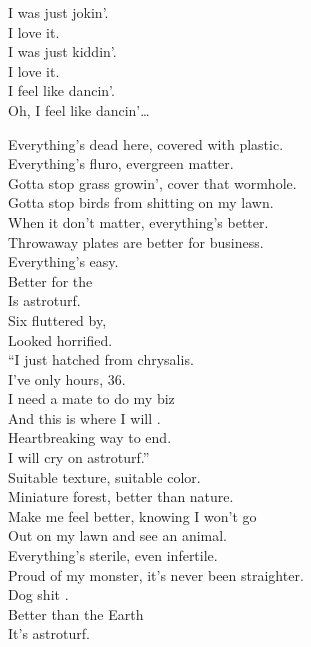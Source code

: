 I was just jokin'. \\
I love it. \\
I was just kiddin'. \\
I love it. \\

I feel like dancin'. \\
Oh, I feel like dancin'… \\





Everything's dead here, covered with plastic. \\
Everything's fluro, evergreen matter. \\
Gotta stop grass growin', cover that wormhole. \\
Gotta stop birds from shitting on my lawn. \\

When it don't matter, everything's better. \\
Throwaway plates are better for business. \\
Everything's easy. \\
Better for the  \\
Is astroturf. \\

Six  fluttered by, \\
Looked horrified. \\
``I just hatched from chrysalis. \\
I've only hours, 36. \\
I need a mate to do my biz \\
And this is where I will . \\
Heartbreaking way to end. \\
I will cry on astroturf.'' \\

Suitable texture, suitable color. \\
Miniature forest, better than nature. \\
Make me feel better, knowing I won't go \\
Out on my lawn and see an animal. \\

Everything's sterile, even infertile. \\
Proud of my monster, it's never been straighter. \\
Dog shit . \\
Better than the Earth \\
It's astroturf. \\

